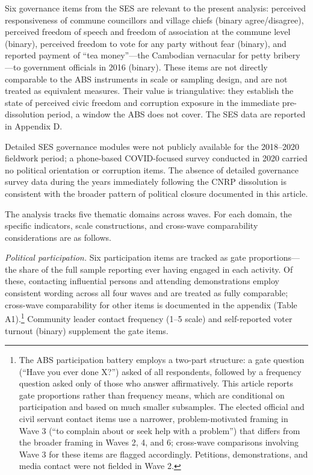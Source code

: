 \documentclass[
  12pt,
  letterpaper]{article}
\begin{document}
Six governance items from the SES are relevant to the present analysis:
perceived responsiveness of commune councillors and village chiefs
(binary agree/disagree), perceived freedom of speech and freedom of
association at the commune level (binary), perceived freedom to vote for
any party without fear (binary), and reported payment of ``tea
money''---the Cambodian vernacular for petty bribery---to government
officials in 2016 (binary). These items are not directly comparable to
the ABS instruments in scale or sampling design, and are not treated as
equivalent measures. Their value is triangulative: they establish the
state of perceived civic freedom and corruption exposure in the
immediate pre-dissolution period, a window the ABS does not cover. The
SES data are reported in Appendix D.

Detailed SES governance modules were not publicly available for the
2018--2020 fieldwork period; a phone-based COVID-focused survey
conducted in 2020 carried no political orientation or corruption items.
The absence of detailed governance survey data during the years
immediately following the CNRP dissolution is consistent with the
broader pattern of political closure documented in this article.

The analysis tracks five thematic domains across waves. For each domain,
the specific indicators, scale constructions, and cross-wave
comparability considerations are as follows.

\emph{Political participation.} Six participation items are tracked as
gate proportions---the share of the full sample reporting ever having
engaged in each activity. Of these, contacting influential persons and
attending demonstrations employ consistent wording across all four waves
and are treated as fully comparable; cross-wave comparability for other
items is documented in the appendix (Table A1).\footnote{The ABS
  participation battery employs a two-part structure: a gate question
  (``Have you ever done X?'') asked of all respondents, followed by a
  frequency question asked only of those who answer affirmatively. This
  article reports gate proportions rather than frequency means, which
  are conditional on participation and based on much smaller subsamples.
  The elected official and civil servant contact items use a narrower,
  problem-motivated framing in Wave 3 (``to complain about or seek help
  with a problem'') that differs from the broader framing in Waves 2, 4,
  and 6; cross-wave comparisons involving Wave 3 for these items are
  flagged accordingly. Petitions, demonstrations, and media contact were
  not fielded in Wave 2.} Community leader contact frequency (1--5
scale) and self-reported voter turnout (binary) supplement the gate
items.
\end{document}
